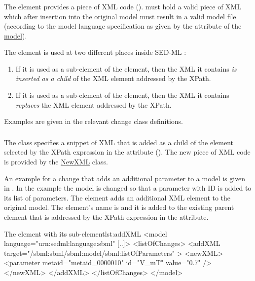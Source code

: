 \subsubsection{}
\label{sec:newXml}
The  element provides a piece of XML code ().  must hold a valid piece of XML which after insertion into the original model must  result in a valid model file (according to the model language specification as given by the \hyperref[sec:language]{} attribute of the \hyperref[class:model]{model}).

The  element is used at two different places inside SED-ML \currentLV:

\begin{enumerate}
	\item{If it is used as a sub-element of the \hyperref[class:addXml]{} element, then the XML it contains \emph{is inserted as a child} of the XML element addressed by the XPath.}
	\item{If it is used as a sub-element of the \hyperref[class:changeXml]{} element, then the XML it contains \emph{replaces} the XML element addressed by the XPath.}
\end{enumerate}

Examples are given in the relevant change class definitions.


\subsubsection{}
\label{class:addXml}
The  class specifies a snippet of XML that is added as a child of the element selected by the XPath expression in the \hyperref[sec:changeTarget]{} attribute (). The new piece of XML code is provided by the \hyperref[sec:newXml]{NewXML} class.

An example for a change that adds an additional parameter to a model is given in . In the example the model is changed so that a parameter with ID  is added to its list of parameters. The  element adds an additional XML element to the original model. The element's name is  and it is added to the existing parent element  that is addressed by the XPath expression in the  attribute.

\begin{myXmlLst}{The  element with its  sub-element}{lst:addXML}
<model language="urn:sedml:language:sbml" [..]>
	<listOfChanges>
		<addXML target="/sbml:sbml/sbml:model/sbml:listOfParameters" >
			<newXML>
				<parameter metaid="metaid_0000010" id="V_mT" value="0.7" />
			</newXML>
		</addXML>
	</listOfChanges>
</model>
\end{myXmlLst}


